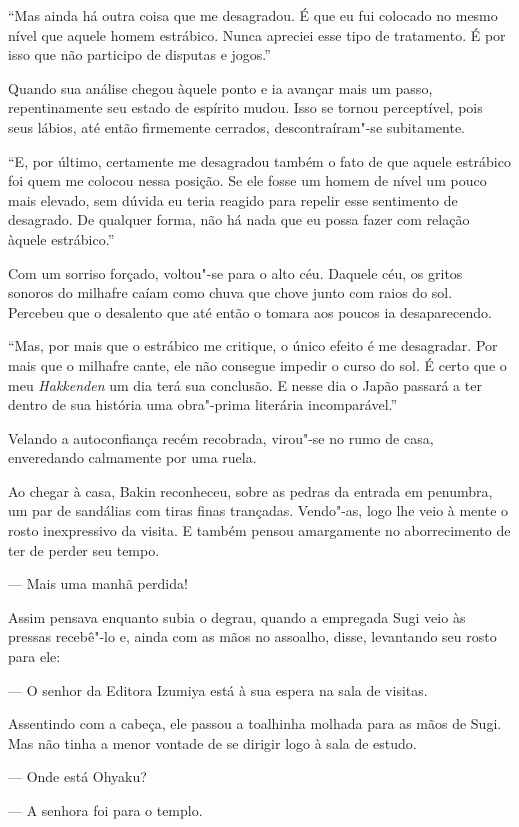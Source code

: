 ``Mas ainda há outra coisa que me desagradou. É que eu fui colocado no
mesmo nível que aquele homem estrábico. Nunca apreciei esse tipo de
tratamento. É por isso que não participo de disputas e jogos.''

Quando sua análise chegou àquele ponto e ia avançar mais um passo,
repentinamente seu estado de espírito mudou. Isso se tornou
perceptível, pois seus lábios, até então firmemente cerrados,
descontraíram"-se subitamente.

``E, por último, certamente me desagradou também o fato de que aquele
estrábico foi quem me colocou nessa posição. Se ele fosse um homem de
nível um pouco mais elevado, sem dúvida eu teria reagido para repelir
esse sentimento de desagrado. De qualquer forma, não há nada que eu
possa fazer com relação àquele estrábico.''

Com um sorriso forçado, voltou"-se para o alto céu. Daquele céu, os
gritos sonoros do milhafre caíam como chuva que chove junto com raios
do sol. Percebeu que o desalento que até então o tomara aos poucos ia
desaparecendo.

``Mas, por mais que o estrábico me critique, o único efeito é me
desagradar. Por mais que o milhafre cante, ele não consegue impedir o
curso do sol. É certo que o meu \textit{Hakkenden} um dia terá sua
conclusão. E nesse dia o Japão passará a ter dentro de sua história uma
obra"-prima literária incomparável.''

Velando a autoconfiança recém recobrada, virou"-se no rumo de casa,
enveredando calmamente por uma ruela.

\sectionitem
Ao chegar à casa, Bakin reconheceu, sobre as pedras da entrada em
penumbra, um par de sandálias com tiras finas trançadas. Vendo"-as, logo
lhe veio à mente o rosto inexpressivo da visita. E também pensou
amargamente no aborrecimento de ter de perder seu tempo.

--- Mais uma manhã perdida!

Assim pensava enquanto subia o degrau, quando a empregada Sugi veio às
pressas recebê"-lo e, ainda com as mãos no assoalho, disse, levantando
seu rosto para ele:

--- O senhor da Editora Izumiya está à sua espera na sala de visitas.

Assentindo com a cabeça, ele passou a toalhinha molhada para as mãos de
Sugi. Mas não tinha a menor vontade de se dirigir logo à sala de
estudo.

--- Onde está Ohyaku?

--- A senhora foi para o templo.

